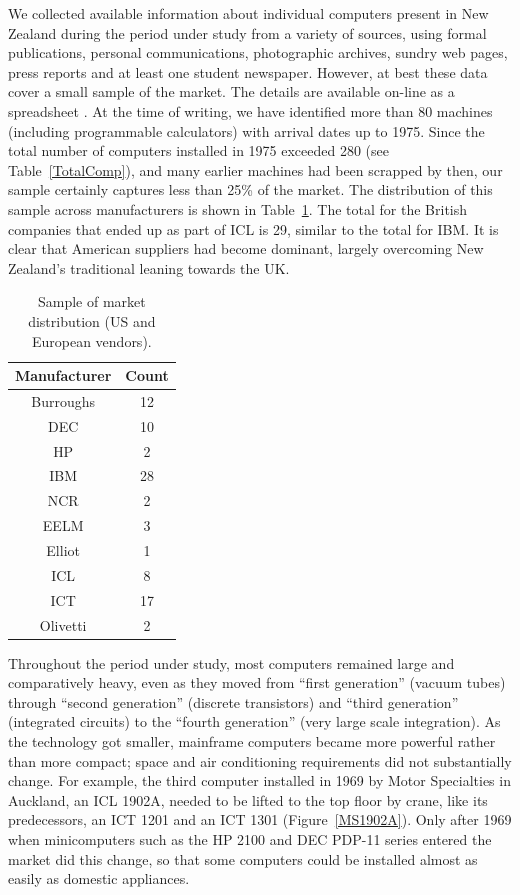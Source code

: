 \documentclass{IEEEcsmag}
\begin{document}
We collected available information about individual computers present in New Zealand during the period under study from a
variety of sources, using formal publications, personal communications, photographic archives, sundry web pages, press reports and at
least one student newspaper. However, at best these data cover a small sample of the market.
The details are available on-line as a spreadsheet \cite{SpreadsheetNZ}.
At the time of writing, we have identified more than 80 machines (including programmable calculators) with arrival dates up to 1975. Since the total number of computers installed in 1975 exceeded 280 (see Table~\ref{TotalComp}), and many earlier machines had been scrapped by then, our sample certainly captures less than 25\% of the market. The distribution of this sample across manufacturers is shown in Table~\ref{TotalManuf}. The total for the British companies that ended up as part of ICL is 29, similar to the total for IBM. It is clear that American suppliers had become dominant, largely overcoming New Zealand’s traditional leaning towards the UK.
\begin{table}[h]
\begin{center}
\begin{tabular}{ |c|c| } 
 \hline
Manufacturer & Count\\ 
\hline
Burroughs & 12\\
DEC & 10\\
HP & 2\\
IBM & 28\\
NCR & 2\\
\hline
EELM & 3\\
Elliot & 1\\
ICL & 8\\
ICT & 17\\ 
Olivetti & 2\\
\hline
\end{tabular}
\vspace{1ex}
\caption{\label{TotalManuf}Sample of market distribution (US and European vendors).}
\end{center}
\end{table}

Throughout the period under study, most computers remained large and comparatively heavy, even as they moved from “first generation” (vacuum tubes) through “second generation” (discrete transistors) and “third generation” (integrated circuits) to the “fourth generation” (very large scale integration). As the technology got smaller, mainframe computers became more powerful rather than more compact; space and air conditioning requirements did not substantially change. For example, the third computer installed in 1969 by Motor Specialties in Auckland, an ICL 1902A, needed to be lifted to the top floor by crane, like its predecessors, an ICT 1201 and an ICT 1301 (Figure~\ref{MS1902A}). Only after 1969 when minicomputers such as the HP 2100 and DEC PDP-11 series entered the market did this change, so that some computers could be installed almost as easily as domestic appliances.
\end{document}
